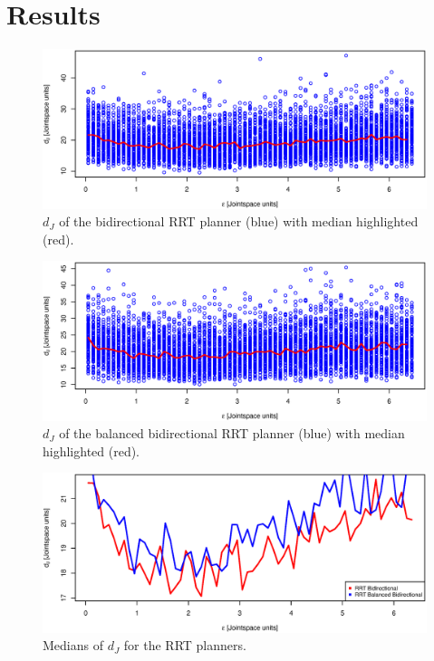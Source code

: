 \section{Results} 

\begin{figure}[h]
 \centering
 \includegraphics[width=\figsize]{graphics/bidirectional_correlation}
 \caption{\(d_J\) of the bidirectional RRT planner (blue) with median highlighted (red).}
 \label{fig:bidir_correlated}
\end{figure}

\begin{figure}[h]
 \centering
 \includegraphics[width=\figsize]{graphics/balanced_correlation}
 \caption{\(d_J\) of the balanced bidirectional RRT planner (blue) with median highlighted (red).}
 \label{fig:balanced_correlated}
\end{figure}


\begin{figure}[h]
 \centering
 \includegraphics[width=\figsize]{graphics/compare_distance}
 \caption{Medians of \(d_J\) for the RRT planners.}
 \label{fig:medians}
\end{figure}

